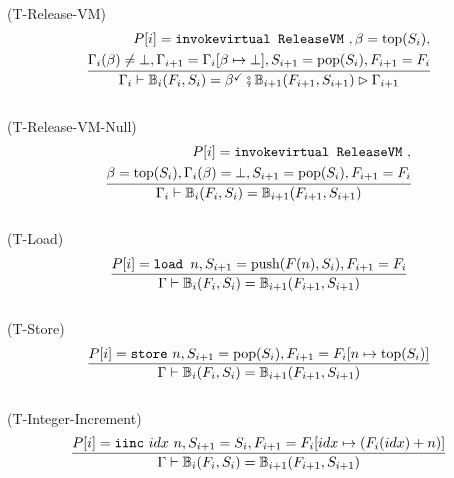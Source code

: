 \documentclass{amsart}
\newcommand{\bFunc}{\mathbb{B}}
\numberwithin{equation}{section}
\theoremstyle{plain} %
\theoremstyle{definition}
\theoremstyle{remark}
\begin{document}
\\
(T-Release-VM)
\begin{equation*}
\frac{\begin{aligned}P[i] = \text{\texttt{invokevirtual ReleaseVM} }, \beta = \text{top}(S_i),\\
\Gamma_i(\beta) \neq \bot, \Gamma_{i+1} = \Gamma_i[\beta \mapsto \bot],
S_{i+1} = \text{pop}(S_i), F_{i+1} = F_i
\end{aligned}}
{\Gamma_i \vdash \bFunc{}_i(F_i, S_i) = \beta^{\checkmark} \fatsemi \bFunc{}_{i+1}(F_{i+1}, S_{i+1}) \rhd \Gamma_{i+1}}
\end{equation*}
\\
(T-Release-VM-Null)
\begin{equation*}
\frac{\begin{aligned}P[i] = \text{\texttt{invokevirtual ReleaseVM} },\\
\beta = \text{top}(S_i), \Gamma_i(\beta) = \bot, S_{i+1} = \text{pop}(S_i), F_{i+1} = F_i
\end{aligned}}
{\Gamma_i \vdash \bFunc{}_i(F_i, S_i) = \bFunc{}_{i+1}(F_{i+1}, S_{i+1})}
\end{equation*}
\\
(T-Load)
\begin{equation*}
\frac{P[i] = \text{\texttt{load }} n, S_{i+1} = \text{push}(F(n), S_i), F_{i+1} = F_i}
{\Gamma \vdash \bFunc{}_i(F_i, S_i) = \bFunc{}_{i+1}(F_{i+1}, S_{i+1})}
\end{equation*}
\\
(T-Store)
\begin{equation*}
\frac{P[i] = \text{\texttt{store} } n, S_{i+1} = \text{pop}(S_i), F_{i+1} = F_i[n \mapsto \text{top}(S_i)]}
{\Gamma \vdash \bFunc{}_i(F_i, S_i) = \bFunc{}_{i+1}(F_{i+1}, S_{i+1})}
\end{equation*}
\\
(T-Integer-Increment)
\begin{equation*}
\frac{P[i] = \text{\texttt{iinc} } idx~n, S_{i+1} = S_i,
F_{i+1} = F_i[idx \mapsto (F_i(idx) + n)]}
{\Gamma \vdash \bFunc{}_i(F_i, S_i) = \bFunc{}_{i+1}(F_{i+1},S_{i+1})}
\end{equation*}
\end{document}
